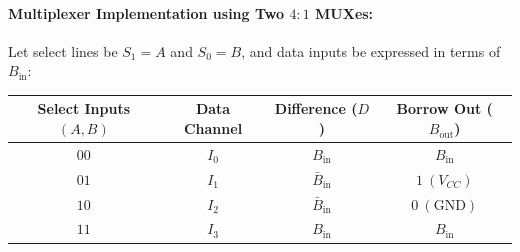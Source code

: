 \documentclass[11pt,a4paper,oneside]{book}
\begin{document}
\paragraph{Multiplexer Implementation using Two $4:1$ MUXes:}
Let select lines be $S_1 = A$ and $S_0 = B$, and data inputs be expressed in terms of $B_{\text{in}}$:
\begin{center}
\begin{tabular}{|c|c|c|c|}
\hline
\textbf{Select Inputs} $(A, B)$ & \textbf{Data Channel} & \textbf{Difference ($D$)} & \textbf{Borrow Out ($B_{\text{out}}$)} \\ \hline
$00$ & $I_0$ & $B_{\text{in}}$ & $B_{\text{in}}$ \\ \hline
$01$ & $I_1$ & $\bar{B}_{\text{in}}$ & $1\ (V_{CC})$ \\ \hline
$10$ & $I_2$ & $\bar{B}_{\text{in}}$ & $0\ (\text{GND})$ \\ \hline
$11$ & $I_3$ & $B_{\text{in}}$ & $B_{\text{in}}$ \\ \hline
\end{tabular}
\end{center}
\end{document}
